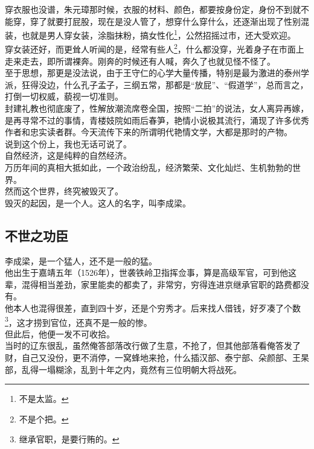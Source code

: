 \begin{multicols}{\theparacolNo}
穿衣服也没谱，朱元璋那时候，衣服的材料、颜色，都要按身份定，身份不到就不能穿，穿了就要打屁股，现在是没人管了，想穿什么穿什么，还逐渐出现了性别混装，也就是男人穿女装，涂脂抹粉，搞女性化\footnote{不是太监。}，公然招摇过市，还大受欢迎。\\

穿女装还好，而更耸人听闻的是，经常有些人\footnote{不是个把。}，什么都没穿，光着身子在市面上走来走去，即所谓裸奔。刚奔的时候还有人喊，奔久了也就见怪不怪了。\\

至于思想，那更是没法说，由于王守仁的心学大量传播，特别是最为激进的泰州学派，狂得没边，什么孔子孟子，三纲五常，那都是“放屁”、“假道学”，总而言之，打倒一切权威，藐视一切准则。\\

封建礼教也彻底废了，性解放潮流席卷全国，按照“二拍”的说法，女人离异再嫁，是再寻常不过的事情，青楼妓院如雨后春笋，艳情小说极其流行，涌现了许多优秀作者和忠实读者群。今天流传下来的所谓明代艳情文学，大都是那时的产物。\\

说到这个份上，我也无话可说了。\\

自然经济，这是纯粹的自然经济。\\

万历年间的真相大抵如此，一个政治纷乱，经济繁荣、文化灿烂、生机勃勃的世界。\\

然而这个世界，终究被毁灭了。\\

毁灭的起因，是一个人。这人的名字，叫李成梁。\\

\subsection{不世之功臣}
李成梁，是一个猛人，还不是一般的猛。\\

他出生于嘉靖五年（1526年），世袭铁岭卫指挥佥事，算是高级军官，可到他这辈，混得相当差劲，家里能卖的都卖了，非常穷，穷得连进京继承官职的路费都没有。\\

他本人也混得很差，直到四十岁，还是个穷秀才。后来找人借钱，好歹凑了个数\footnote{继承官职，是要行贿的。}，这才捞到官位，还真不是一般的惨。\\

但此后，他便一发不可收拾。\\

当时的辽东很乱，虽然俺答部落改行做了生意，不抢了，但其他部落看俺答发了财，自己又没份，更不消停，一窝蜂地来抢，什么插汉部、泰宁部、朵颜部、王杲部，乱得一塌糊涂，乱到十年之内，竟然有三位明朝大将战死。\\


\end{multicols}
